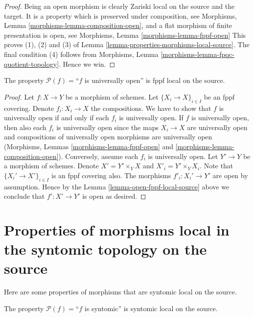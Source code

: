 \begin{proof}
Being an open morphism is clearly Zariski local on the source and the target.
It is a property which is preserved under composition, see
Morphisms, Lemma \ref{morphisms-lemma-composition-open}, and
a flat morphism of finite presentation is open, see
Morphisms, Lemma \ref{morphisms-lemma-fppf-open}
This proves
(1), (2) and (3) of Lemma \ref{lemma-properties-morphisms-local-source}.
The final condition (4) follows from
Morphisms, Lemma \ref{morphisms-lemma-fpqc-quotient-topology}.
Hence we win.
\end{proof}

\begin{lemma}
\label{lemma-universally-open-fppf-local-source}
The property $\mathcal{P}(f)=$``$f$ is universally open''
is fppf local on the source.
\end{lemma}

\begin{proof}
Let $f : X \to Y$ be a morphism of schemes.
Let $\{X_i \to X\}_{i \in I}$ be an fppf covering.
Denote $f_i : X_i \to X$ the compositions.
We have to show that $f$ is universally open if and only if
each $f_i$ is universally open. If $f$ is universally open,
then also each $f_i$ is universally open since the maps
$X_i \to X$ are universally open and compositions
of universally open morphisms are universally open
(Morphisms, Lemmas \ref{morphisms-lemma-fppf-open}
and \ref{morphisms-lemma-composition-open}).
Conversely, assume each $f_i$ is universally open.
Let $Y' \to Y$ be a morphism of schemes.
Denote $X' = Y' \times_Y X$ and $X'_i = Y' \times_Y X_i$.
Note that $\{X_i' \to X'\}_{i \in I}$ is an fppf covering also.
The morphisms $f'_i : X_i' \to Y'$ are open by assumption.
Hence by the Lemma \ref{lemma-open-fppf-local-source}
above we conclude that $f' : X' \to Y'$ is open as desired.
\end{proof}



\section{Properties of morphisms local in the syntomic topology on the source}
\label{section-syntomic-local-source}

\noindent
Here are some properties of morphisms that are syntomic local on the source.

\begin{lemma}
\label{lemma-syntomic-syntomic-local-source}
The property $\mathcal{P}(f)=$``$f$ is syntomic''
is syntomic local on the source.
\end{lemma}

